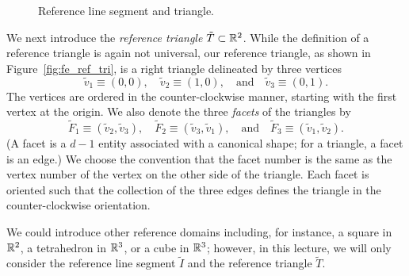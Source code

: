 \begin{figure}
  \centering
  \caption{Reference line segment and triangle.\label{fig:fe_ref_elem}}
\end{figure}

  
We next introduce the \emph{reference triangle} $\tilde T \subset \mathbb{R}^2$. While the definition of a reference triangle is again not universal, our reference triangle, as shown in Figure~\ref{fig:fe_ref_tri}, is a right triangle delineated by three vertices
\begin{equation*}
  \tilde v_1 \equiv (0,0), \quad \tilde v_2 \equiv (1,0), \quad \text{and} \quad \tilde v_3 \equiv (0,1).
\end{equation*}
The vertices are ordered in the counter-clockwise manner, starting with the first vertex at the origin. We also denote the three \emph{facets} of the triangles by
\begin{equation*}
  \tilde F_1 \equiv ( \tilde v_2, \tilde v_3), \quad  \tilde F_2 \equiv ( \tilde v_3, \tilde v_1), \quad \text{and} \quad  \tilde F_3 \equiv ( \tilde v_1, \tilde v_2).
\end{equation*}
(A facet is a $d-1$ entity associated with a canonical shape; for a triangle, a facet is an edge.)  We choose the convention that the facet number is the same as the vertex number of the vertex on the other side of the triangle. Each facet is oriented such that the collection of the three edges defines the triangle in the counter-clockwise orientation.  

We could introduce other reference domains including, for instance, a square in $\mathbb{R}^2$, a tetrahedron in $\mathbb{R}^3$, or a cube in $\mathbb{R}^3$; however, in this lecture, we will only consider the reference line segment $\tilde I$ and the reference triangle $\tilde T$.  

